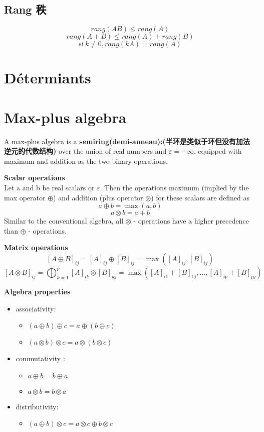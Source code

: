 \documentclass{book}
\begin{document}
\section{Rang 秩}
$$rang(AB)\leqslant rang(A)$$
$$rang(A+B)\leqslant rang(A)+rang(B)$$
$$  \mathrm{si} ~k \neq 0, rang(kA)=rang(A)$$


\chapter{D\'etermiants}

\chapter{Max-plus algebra}
A max-plus algebra is a \textbf{semiring(demi-anneau):(半环是类似于环但没有加法逆元的代数结构)} over the union of real numbers and
$\varepsilon = -\infty$, equipped with maximum and addition as the two binary operations.

\textbf{Scalar operations}\\
Let a and b be real scalars or $\varepsilon$. Then the operations maximum (implied by the max operator  $\oplus$) and addition (plus operator  $\otimes$) for these scalars are defined as
$$ a \oplus b = \max(a,b) $$
$$ a \otimes b = a + b $$
Similar to the conventional algebra, all $\otimes$ - operations have a higher precedence than $\oplus$ - operations.

\textbf{Matrix operations}\\
$$ [A \oplus B]_{ij} = [A]_{ij} \oplus [B]_{ij} = \max([A]_{ij} , [B]_{ij}) $$
$$ [A \otimes B]_{ij} = \bigoplus_{k = 1}^p [A]_{ik} \otimes [B]_{kj} = \max([A]_{i1} + [B]_{1j}, \dots, [A]_{ip} + [B]_{pj}) $$

\textbf{Algebra properties}\\
\begin{itemize}
\item associativity:
	\begin{itemize}
	\item $(a \oplus b) \oplus c = a \oplus (b \oplus c) $
	\item $(a\otimes b) \otimes c = a \otimes (b \otimes c)$
	\end{itemize}
\item commutativity :
	\begin{itemize}
	\item $a \oplus b = b \oplus a $
	\item $a \otimes b = b \otimes a $
	\end{itemize}
\item distributivity:
	\begin{itemize}
	\item  $(a \oplus b) \otimes c = a \otimes c \oplus b \otimes c $
	\end{itemize}
\end{itemize}
\end{document}

